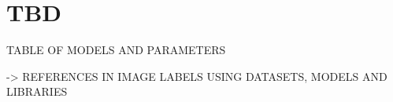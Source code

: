 \chapter{TBD}
\label{chap:chap3}

\begin{table*}[htb!]
    \label{tab:datasets_used}
    \caption[Datasets used for benchmarking, where \emph{I} denotes the number of instances and \emph{P} the number of predictors.]{Datasets used for benchmarking, where \emph{I} denotes the number of instances and \emph{P} the number of predictors}
    \centering
\end{table*}

TABLE OF MODELS AND PARAMETERS 

-> REFERENCES IN IMAGE LABELS USING DATASETS, MODELS AND LIBRARIES